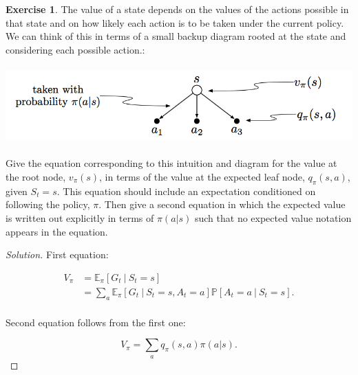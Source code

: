 \documentclass[oneside,11pt]{article}
\theoremstyle{definition}
\newtheorem{exer}[thm]{Exercise}
\newcommand{\PP}{\mathbb{P}}
\newcommand{\EEpi}{\mathbb{E}_{\pi}}
\newcommand\givenbase[1][]{\:#1\lvert\:}
\let\given\givenbase
\newenvironment{solution}
{\renewcommand\qedsymbol{$\blacksquare$}\begin{proof}[Solution]} {\end{proof}}
\begin{document}
\begin{exer}
The value of a state depends on the values of the actions possible in that state and on how likely each action is to be taken under the current policy. We can think of this in terms of a small backup diagram rooted at the state and considering each possible action.:

\includegraphics[width=14cm, height=3cm]{exer_3_11}

Give the equation corresponding to this intuition and diagram for the value at the root node, $v_{\pi}(s)$, in terms of the value at the expected leaf node, $q_{\pi}(s,a)$, given $S_t = s$. This equation should include an expectation conditioned on following the policy, $\pi$. Then give a second equation in which the expected value is written out explicitly in terms of $\pi(a|s)$ such that no expected value notation appears in the equation.
\end{exer}

\begin{shaded}
\begin{solution} 

First equation:

\begin{equation*} %
\begin{split}
V_{\pi} & = \EEpi [G_t \given S_t = s] \\
 & =\sum_a \EEpi [G_t \given S_t = s, A_t = a] \PP[A_t = a \given S_t = s]. \\
\end{split}
\end{equation*}

Second equation follows from the first one:

\[ V_{\pi} = \sum_a q_{\pi}(s,a) \pi(a|s). \]




\end{solution}
\end{shaded}
\end{document}
